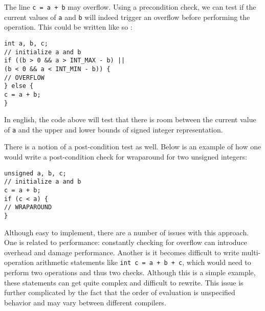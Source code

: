 The line \texttt{c = a + b} may overflow. Using a precondition check, we can test if the current values of \texttt{a} and \texttt{b} will indeed trigger an overflow before performing the operation. This could be written like so \cite{secure_coding}:

\begin{center}
\parbox{0.9\linewidth}{
\texttt{int a, b, c;\\
// initialize a and b\\
if ((b > 0 \&\& a > INT\_MAX - b) ||\\
\hspace*{2em}(b < 0 \&\& a < INT\_MIN - b)) \{\\
\hspace*{1.5em}// OVERFLOW\\
\} else \{\\
\hspace*{1.5em}c = a + b;\\
\}}
}
\end{center}
In english, the code above will test that there is room between the current value of \texttt{a} and the upper and lower bounds of signed integer representation.

There is a notion of a post-condition test as well. Below is an example of how one would write a post-condition check for wraparound for two unsigned integers:

\begin{center}
\parbox{0.9\linewidth}{
\texttt{unsigned a, b, c;\\
// initialize a and b\\
c = a + b;\\
if (c < a) \{\\
\hspace*{1.5em}// WRAPAROUND\\
\}}
}
\end{center}

Although easy to implement, there are a number of issues with this approach. One is related to performance: constantly checking for overflow can introduce overhead and damage performance. Another is it becomes difficult to write multi-operation arithmetic statements like \texttt{int c = a + b + c}, which would need to perform two operations and thus two checks. Although this is a simple example, these statements can get quite complex and difficult to rewrite. This issue is further complicated by the fact that the order of evaluation is unspecified behavior and may vary between different compilers.

